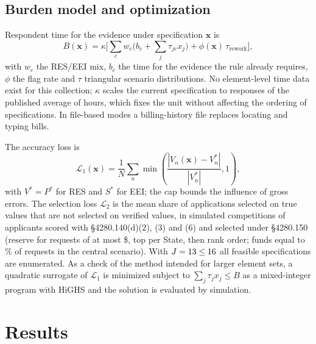 \documentclass[preprint,12pt]{elsarticle}
\begin{document}
\subsection{Burden model and optimization}

Respondent time for the evidence under specification $\mathbf{x}$ is
\begin{equation}
B(\mathbf{x})=\kappa\Big[\sum_{c} w_c\Big(b_c+\sum_j \tau_{jc}x_j\Big)+\phi(\mathbf{x})\,
\tau_{\mathrm{rework}}\Big],
\label{eq:burden}
\end{equation}
with $w_c$ the RES/EEI mix, $b_c$ the time for the evidence the rule already requires,
$\phi$ the flag rate and $\tau$ triangular scenario distributions. No element-level time
data exist for this collection; $\kappa$ scales the current specification to
\AnchorResponses{} responses of the published average of \AuditHoursPerResponse{} hours,
which fixes the unit without affecting the ordering of specifications. In file-based
modes a billing-history file replaces locating and typing bills.

The accuracy loss is
\begin{equation}
\mathcal{L}_1(\mathbf{x})=\frac1N\sum_n \min\!\left(\frac{|V_n(\mathbf{x})-V_n^\ast|}{|V_n^\ast|},1\right),
\label{eq:loss}
\end{equation}
with $V^\ast=P^\ast$ for RES and $S^\ast$ for EEI; the cap bounds the influence of gross
errors. The selection loss $\mathcal{L}_2$ is the mean share of applications selected on
true values that are not selected on verified values, in \NCompetitions{} simulated
competitions of \NCompetitionApplicants{} applicants scored with \S4280.140(d)(2), (3)
and (6) and selected under \S4280.150 (reserve for requests of at most \$\SmallRequest, top
\CfgTopPerState{} per State, then rank order; funds equal to \CfgFundingRatio\% of
requests in the central scenario). With $J=13\le 16$ all \NSpecs{} feasible
specifications are enumerated. As a check of the method intended for larger element
sets, a quadratic surrogate of $\mathcal{L}_1$ is minimized subject to
$\sum_j\tau_jx_j\le B$ as a mixed-integer program with HiGHS
\cite{huangfu2018parallelizing} and the solution is evaluated by simulation.

\section{Results}
\end{document}
